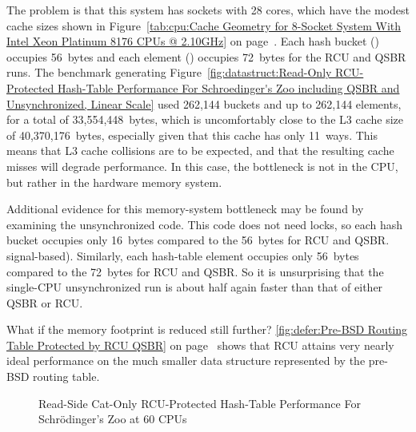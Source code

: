 The problem is that this system has sockets with 28 cores, which have
the modest cache sizes shown in
Figure~\ref{tab:cpu:Cache Geometry for 8-Socket System With Intel Xeon Platinum 8176 CPUs @ 2.10GHz}
on page~\pageref{tab:cpu:Cache Geometry for 8-Socket System With Intel Xeon Platinum 8176 CPUs @ 2.10GHz}.
Each hash bucket () occupies 56~bytes and each
element () occupies 72~bytes for the RCU and QSBR runs.
The benchmark generating
Figure~\ref{fig:datastruct:Read-Only RCU-Protected Hash-Table Performance For Schroedinger's Zoo including QSBR and Unsynchronized, Linear Scale}
used 262,144 buckets and up to 262,144 elements, for a total
of 33,554,448~bytes, which is uncomfortably close to the L3 cache size
of 40,370,176~bytes, especially given that this cache has only 11~ways.
This means that L3 cache collisions are to be expected, and that the
resulting cache misses will degrade performance.
In this case, the bottleneck is not in the CPU, but rather in the hardware
memory system.

Additional evidence for this memory-system bottleneck may be found by
examining the unsynchronized code.
This code does not need locks, so each hash bucket occupies only 16~bytes
compared to the 56~bytes for RCU and QSBR.
signal-based).
Similarly, each hash-table element occupies only 56~bytes compared to the
72~bytes for RCU and QSBR.
So it is unsurprising that the single-CPU unsynchronized run is about
half again faster than that of either QSBR or RCU.

What if the memory footprint is reduced still further?
\cref{fig:defer:Pre-BSD Routing Table Protected by RCU QSBR}
on page~\pageref{fig:defer:Pre-BSD Routing Table Protected by RCU QSBR With Non-Initial rcu-head}
shows that RCU attains very nearly ideal performance on the much smaller
data structure represented by the pre-BSD routing table.

\begin{figure}[tb]
\centering
{}
\caption{Read-Side Cat-Only RCU-Protected Hash-Table Performance For Schr\"odinger's Zoo at 60 CPUs}
\label{fig:datastruct:Read-Side Cat-Only RCU-Protected Hash-Table Performance For Schroedinger's Zoo at 60 CPUs}
\end{figure}

